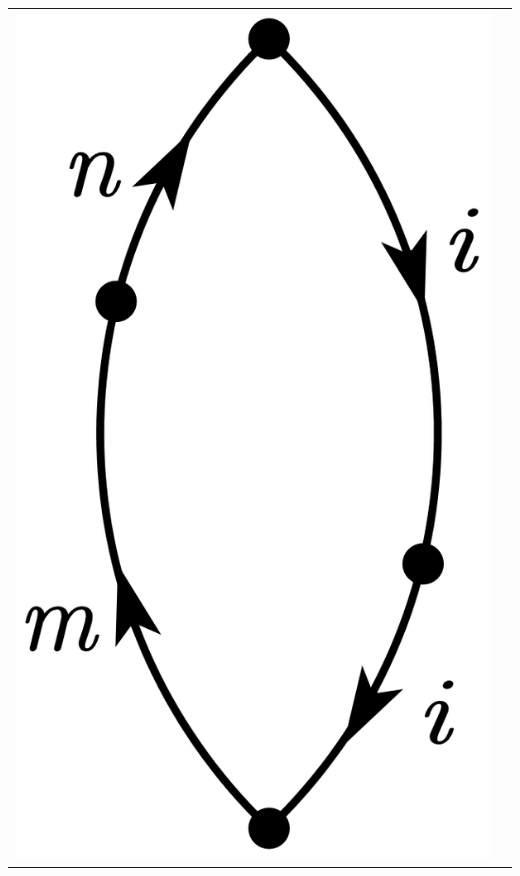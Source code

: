 \documentclass[a4paper]{book}
\newcounter{solution}[chapter]
\begin{document}
\begin{solution}
\begin{center}
\begin{tabular}{cc}
		\begin{minipage}{0.42\linewidth}
		\centering
		\includegraphics[scale=1.0,trim=0 -4 0 -4]{./pictures/6.02/4.png}
		\captionof*{figure}{$(-1)^{2+1} { \sum_{mn} }^\prime \frac{ V_{ni} V_{ii} V_{im} V_{mn} }{ ( E^{(0)}_i - E^{(0)}_n) ( E^{(0)}_i - E^{(0)}_m )^2 }$}
		\end{minipage} \\
		

\end{tabular}
\end{center}
\end{solution}
\end{document}
